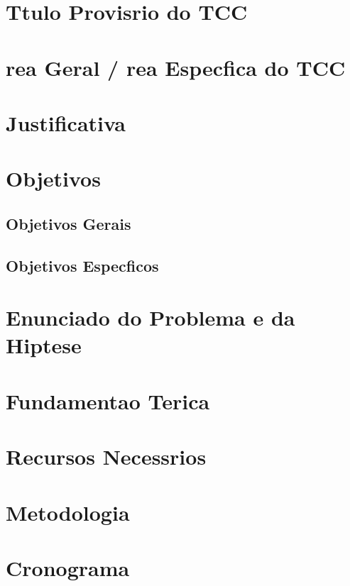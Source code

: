 \documentclass[12pt,a4paper,tocpage=prefix,floatnumber=chapter,chapter=TITLE,section=Title,header=plain]{abnt}
\begin{document}
  \begin{espacosimples}
  \end{espacosimples}
  \begin{espacoumemeio}

    \chapter{T\ih tulo Provis\oh rio do TCC}
    \label{pro:titulo}
    \Nome

    \chapter{\AH rea Geral / \AH rea Espec\ih fica do TCC}
    \label{pro:area}

    \chapter{Justificativa}
    \label{pro:justificativa}

    \chapter{Objetivos}
    \label{pro:objetivos}

    \section{Objetivos Gerais}
    \label{pro:objetivos_gerais}

    \section{Objetivos Espec\ih ficos}
    \label{pro:objetivos_especificos}

    \chapter{Enunciado do Problema e da Hip\oh tese}
    \label{pro:enunciado}

    \chapter{Fundamenta\ca o Te\oh rica}
    \label{pro:fundamentacao}

    \chapter{Recursos Necess\ah rios}
    \label{pro:recursos}

    \chapter{Metodologia}
    \label{pro:metodologia}

    \chapter{Cronograma}
    \label{pro:cronograma}
  
  \end{espacoumemeio}
\end{document}
